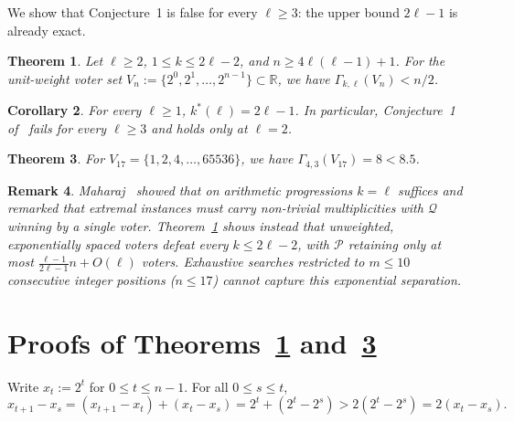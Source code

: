 \documentclass[11pt]{article}
\newtheorem{theorem}{Theorem}
\newtheorem{corollary}[theorem]{Corollary}
\newtheorem{remark}[theorem]{Remark}
\begin{document}
We show that Conjecture~1 is false for every $\ell \ge 3$: the upper bound $2\ell - 1$ is already exact.

\begin{theorem}\label{thm:lower}
Let $\ell \ge 2$, $1 \le k \le 2\ell - 2$, and $n \ge 4\ell(\ell - 1) + 1$. For the unit-weight voter set $V_n := \{2^0, 2^1, \dots, 2^{n-1}\} \subset \mathbb{R}$, we have $\Gamma_{k,\ell}(V_n) < n/2$.
\end{theorem}

\begin{corollary}\label{cor:exact}
For every $\ell \ge 1$, $k^*(\ell) = 2\ell - 1$. In particular, Conjecture~1 of~\cite{Maharaj2026} fails for every $\ell \ge 3$ and holds only at $\ell = 2$.
\end{corollary}

\begin{theorem}\label{thm:n17}
For $V_{17} = \{1, 2, 4, \dots, 65536\}$, we have $\Gamma_{4,3}(V_{17}) = 8 < 8.5$.
\end{theorem}

\begin{remark}
Maharaj~\cite[\S4.2]{Maharaj2026} showed that on arithmetic progressions $k = \ell$ suffices and remarked that extremal instances must carry non-trivial multiplicities with $\mathcal{Q}$ winning by a single voter. Theorem~\ref{thm:lower} shows instead that unweighted, exponentially spaced voters defeat every $k \le 2\ell - 2$, with $\mathcal{P}$ retaining only at most $\frac{\ell - 1}{2\ell - 1}n + O(\ell)$ voters. Exhaustive searches restricted to $m \le 10$ consecutive integer positions ($n \le 17$) cannot capture this exponential separation.
\end{remark}

\section{Proofs of Theorems~\ref{thm:lower} and~\ref{thm:n17}}

Write $x_t := 2^t$ for $0 \le t \le n - 1$. For all $0 \le s \le t$,
\begin{equation}\label{eq:exp}
x_{t+1} - x_s = (x_{t+1} - x_t) + (x_t - x_s) = 2^t + (2^t - 2^s) > 2(2^t - 2^s) = 2(x_t - x_s).
\end{equation}
\end{document}
